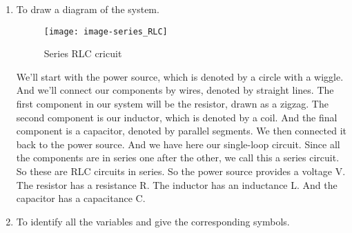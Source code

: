 \begin{enumerate}[label=Step.\arabic*]
\item To draw a diagram of the system.

  \begin{figure}[ht!]
    \centering
    \texttt{[image: image-series\_RLC]}
    \caption{Series RLC cricuit}
  \end{figure}

  We'll start with the power source, which is denoted
  by a circle with a wiggle.
  And we'll connect our components by wires,
  denoted by straight lines.
  The first component in our system
  will be the resistor, drawn as a zigzag.
  The second component is our inductor,
  which is denoted by a coil.
  And the final component is a capacitor,
  denoted by parallel segments.
  We then connected it back to the power source.
  And we have here our single-loop circuit.
  Since all the components are in series one after the other,
  we call this a series circuit.
  So these are RLC circuits in series.
  So the power source provides a voltage V.
  The resistor has a resistance R. The inductor has
  an inductance L. And the capacitor has a capacitance C.

\item To identify all the variables and give the corresponding symbols. \\


\end{enumerate}
